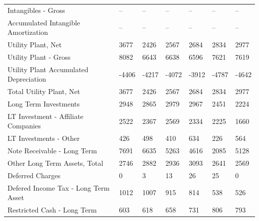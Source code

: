 \documentclass[grad,numbers]{coppe}
\begin{document}
\begin{longtable}[t]{lllllll}
  \hspace{1em}\hspace{1em}Intangibles - Gross & -- & -- & -- & -- & -- & --\\
  \hspace{1em}\hspace{1em}Accumulated Intangible Amortization & -- & -- & -- & -- & -- & --\\
  \hspace{1em}Utility Plant, Net & 3677 & 2426 & 2567 & 2684 & 2834 & 2977\\
  \hspace{1em}\hspace{1em}Utility Plant - Gross & 8082 & 6643 & 6638 & 6596 & 7621 & 7619\\
  \hspace{1em}\hspace{1em}Utility Plant Accumulated Depreciation & -4406 & -4217 & -4072 & -3912 & -4787 & -4642\\
  \hspace{1em}Total Utility Plant, Net & 3677 & 2426 & 2567 & 2684 & 2834 & 2977\\
  \hspace{1em}Long Term Investments & 2948 & 2865 & 2979 & 2967 & 2451 & 2224\\
  \hspace{1em}\hspace{1em}LT Investment - Affiliate Companies & 2522 & 2367 & 2569 & 2334 & 2225 & 1660\\
  \hspace{1em}\hspace{1em}LT Investments - Other & 426 & 498 & 410 & 634 & 226 & 564\\
  \hspace{1em}Note Receivable - Long Term & 7691 & 6635 & 5263 & 4616 & 2085 & 5128\\
  \hspace{1em}Other Long Term Assets, Total & 2746 & 2882 & 2936 & 3093 & 2641 & 2569\\
  \hspace{1em}\hspace{1em}Deferred Charges & 0 & 3 & 13 & 26 & 25 & 0\\
  \hspace{1em}\hspace{1em}Defered Income Tax - Long Term Asset & 1012 & 1007 & 915 & 814 & 538 & 526\\
  \hspace{1em}\hspace{1em}Restricted Cash - Long Term & 603 & 618 & 658 & 731 & 806 & 793\\

\end{longtable}
\end{document}

